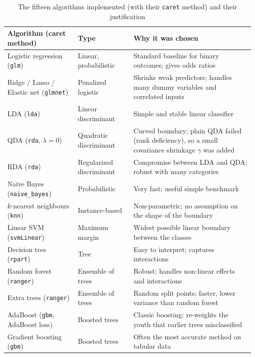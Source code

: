\documentclass[11pt,a4paper]{article}
\begin{document}
\begin{table}[H]
\centering
\caption{The fifteen algorithms implemented (with their \texttt{caret} method) and their justification}
\label{tab:algos}
\small
{}
\begin{tabularx}{\textwidth}{@{}l l Y@{}}
\toprule
\textbf{Algorithm (caret method)} & \textbf{Type} & \textbf{Why it was chosen} \\
\midrule
Logistic regression (\texttt{glm}) & Linear, probabilistic & Standard baseline for binary outcomes; gives odds ratios \\
Ridge / Lasso / Elastic net (\texttt{glmnet}) & Penalized logistic & Shrinks weak predictors; handles many dummy variables and correlated inputs \\
LDA (\texttt{lda}) & Linear discriminant & Simple and stable linear classifier \\
QDA (\texttt{rda}, $\lambda=0$) & Quadratic discriminant & Curved boundary; plain QDA failed (rank deficiency), so a small covariance shrinkage $\gamma$ was added \\
RDA (\texttt{rda}) & Regularized discriminant & Compromise between LDA and QDA; robust with many categories \\
Naive Bayes (\texttt{naive\_bayes}) & Probabilistic & Very fast; useful simple benchmark \\
$k$-nearest neighbours (\texttt{knn}) & Instance-based & Non-parametric; no assumption on the shape of the boundary \\
Linear SVM (\texttt{svmLinear}) & Maximum margin & Widest possible linear boundary between the classes \\
Decision tree (\texttt{rpart}) & Tree & Easy to interpret; captures interactions \\
Random forest (\texttt{ranger}) \cite{breiman} & Ensemble of trees & Robust; handles non-linear effects and interactions \\
Extra trees (\texttt{ranger}) & Ensemble of trees & Random split points; faster, lower variance than random forest \\
AdaBoost (\texttt{gbm}, AdaBoost loss) & Boosted trees & Classic boosting: re-weights the youth that earlier trees misclassified \\
Gradient boosting (\texttt{gbm}) \cite{friedman} & Boosted trees & Often the most accurate method on tabular data \\
\bottomrule
\end{tabularx}
\end{table}
\end{document}
